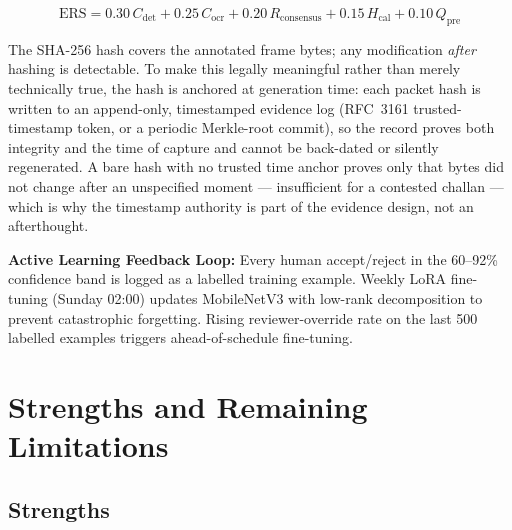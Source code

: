 \documentclass[11pt,a4paper]{article}
\begin{document}
\begin{equation}
\text{ERS} = 0.30\,C_{\text{det}} + 0.25\,C_{\text{ocr}} + 0.20\,R_{\text{consensus}} + 0.15\,H_{\text{cal}} + 0.10\,Q_{\text{pre}}
\tag{2}
\end{equation}

The SHA-256 hash covers the annotated frame bytes; any modification \emph{after} hashing is detectable. To make this legally meaningful rather than merely technically true, the hash is anchored at generation time: each packet hash is written to an append-only, timestamped evidence log (RFC~3161 trusted-timestamp token, or a periodic Merkle-root commit), so the record proves both integrity and the time of capture and cannot be back-dated or silently regenerated. A bare hash with no trusted time anchor proves only that bytes did not change after an unspecified moment --- insufficient for a contested challan --- which is why the timestamp authority is part of the evidence design, not an afterthought.

\textbf{Active Learning Feedback Loop:} Every human accept/reject in the 60–92\% confidence band is logged as a labelled training example. Weekly LoRA fine-tuning (Sunday 02:00) updates MobileNetV3 with low-rank decomposition to prevent catastrophic forgetting. Rising reviewer-override rate on the last 500 labelled examples triggers ahead-of-schedule fine-tuning.

\section{Strengths and Remaining Limitations}

\subsection*{Strengths}
\end{document}
